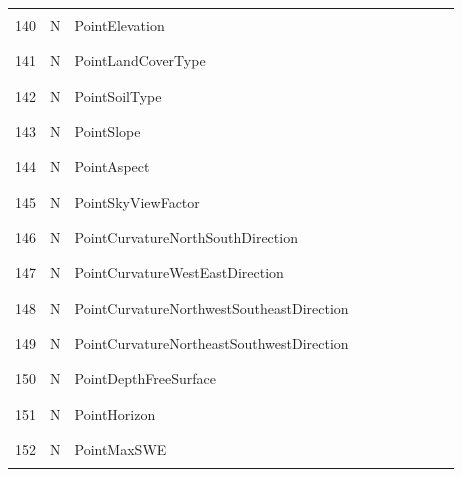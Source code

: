 \begin{longtable}{|c|c|l|c|c|c|c|p{}|c|p{}|}
&&&&&&&&&\\
140 & N & PointElevation & & & & & & & \\
&&&&&&&&&\\\hline%
&&&&&&&&&\\
141 & N & PointLandCoverType & & & & & & & \\
&&&&&&&&&\\\hline%
&&&&&&&&&\\
142 & N & PointSoilType & & & & & & & \\
&&&&&&&&&\\\hline%
&&&&&&&&&\\
143 & N & PointSlope & & & & & & & \\
&&&&&&&&&\\\hline%
&&&&&&&&&\\
144 & N & PointAspect & & & & & & & \\
&&&&&&&&&\\\hline%
&&&&&&&&&\\
145 & N & PointSkyViewFactor & & & & & & & \\
&&&&&&&&&\\\hline%
&&&&&&&&&\\
146 & N & PointCurvatureNorthSouthDirection & & & & & & & \\
&&&&&&&&&\\\hline%
&&&&&&&&&\\
147 & N & PointCurvatureWestEastDirection & & & & & & & \\
&&&&&&&&&\\\hline%
&&&&&&&&&\\
148 & N & PointCurvatureNorthwestSoutheastDirection & & & & & & & \\
&&&&&&&&&\\\hline%
&&&&&&&&&\\
149 & N & PointCurvatureNortheastSouthwestDirection & & & & & & & \\
&&&&&&&&&\\\hline%
&&&&&&&&&\\
150 & N & PointDepthFreeSurface & & & & & & & \\
&&&&&&&&&\\\hline%
&&&&&&&&&\\
151 & N & PointHorizon & & & & & & & \\
&&&&&&&&&\\\hline%
&&&&&&&&&\\
152 & N & PointMaxSWE & & & & & & & \\
&&&&&&&&&\\\hline%

\end{longtable}
